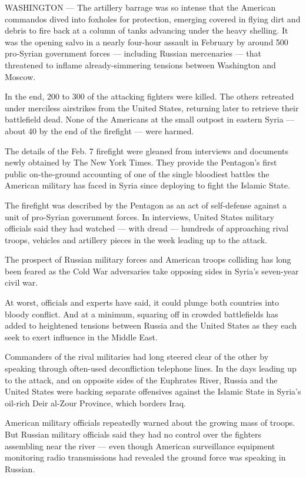WASHINGTON --- The artillery barrage was so intense that the American
commandos dived into foxholes for protection, emerging covered in flying
dirt and debris to fire back at a column of tanks advancing under the
heavy shelling. It was the opening salvo in a nearly four-hour assault
in February by around 500 pro-Syrian government forces --- including
Russian mercenaries --- that threatened to inflame already-simmering
tensions between Washington and Moscow.

In the end, 200 to 300 of the attacking fighters were killed. The others
retreated under merciless airstrikes from the United States, returning
later to retrieve their battlefield dead. None of the Americans at the
small outpost in eastern Syria --- about 40 by the end of the firefight
--- were harmed.

The details of the Feb. 7 firefight were gleaned from interviews and
documents newly obtained by The New York Times. They provide the
Pentagon's first public on-the-ground accounting of one of the single
bloodiest battles the American military has faced in Syria since
deploying to fight the Islamic State.

The firefight was described by the Pentagon as an act of self-defense
against a unit of pro-Syrian government forces. In interviews, United
States military officials said they had watched --- with dread ---
hundreds of approaching rival troops, vehicles and artillery pieces in
the week leading up to the attack.

The prospect of Russian military forces and American troops colliding
has long been feared as the Cold War adversaries take opposing sides in
Syria's seven-year civil war.

At worst, officials and experts have said, it could plunge both
countries into bloody conflict. And at a minimum, squaring off in
crowded battlefields has added to heightened tensions between Russia and
the United States as they each seek to exert influence in the Middle
East.

Commanders of the rival militaries had long steered clear of the other
by speaking through often-used deconfliction telephone lines. In the
days leading up to the attack, and on opposite sides of the Euphrates
River, Russia and the United States were backing separate offensives
against the Islamic State in Syria's oil-rich Deir al-Zour Province,
which borders Iraq.

American military officials repeatedly warned about the growing mass of
troops. But Russian military officials said they had no control over the
fighters assembling near the river --- even though American surveillance
equipment monitoring radio transmissions had revealed the ground force
was speaking in Russian.

